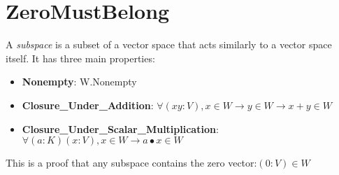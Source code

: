 \section{ZeroMustBelong}


\begin{definition}
  \label{definition : Subspace}
  \leanok
  A \emph{subspace} is a subset of a vector space that acts similarly to a vector space itself. It has three main properties:
  \begin{itemize}
    \item \textbf{Nonempty}:
    W.Nonempty
    \item \textbf{Closure\_Under\_Addition}:
    $\forall (x y : V), x ∈ W \rightarrow y \in W \rightarrow x + y \in W$
    \item \textbf{Closure\_Under\_Scalar\_Multiplication}:
    $\forall (a : K) (x : V), x \in W \rightarrow a \bullet x \in W$
  \end{itemize}
\end{definition}

\begin{theorem}
  \label{theorem : subspace_contains_zero}
  \leanok
  This is a proof that any subspace contains the zero vector:$(0 : V) \in W$
\end{theorem}
